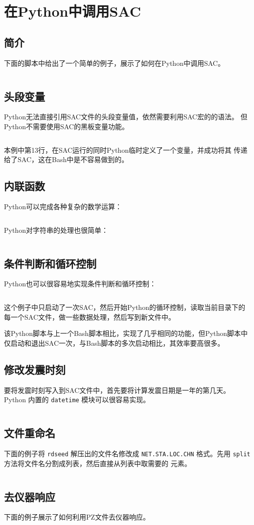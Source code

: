\section{在Python中调用SAC}
\label{sec:sac-python}

\subsection{简介}
下面的脚本中给出了一个简单的例子，展示了如何在Python中调用SAC。
\inputminted{python}{./call-in-script/simple-script.py}

\subsection{头段变量}
Python无法直接引用SAC文件的头段变量值，依然需要利用SAC宏的的语法。
但Python不需要使用SAC的黑板变量功能。
\inputminted{python}{./call-in-script/variables.py}
本例中第13行，在SAC运行的同时Python临时定义了一个变量，并成功将其
传递给了SAC，这在Bash中是不容易做到的。

\subsection{内联函数}
Python可以完成各种复杂的数学运算：
\inputminted{python}{./call-in-script/arithmetic-functions.py}

Python对字符串的处理也很简单：
\inputminted{python}{./call-in-script/string-functions.py}

\subsection{条件判断和循环控制}
Python也可以很容易地实现条件判断和循环控制：
\inputminted{python}{./call-in-script/do-loops.py}
这个例子中只启动了一次SAC，然后开始Python的循环控制，读取当前目录下的
每一个SAC文件，做一些数据处理，然后写到新文件中。

该Python脚本与上一个Bash脚本相比，实现了几乎相同的功能，但Python脚本中
仅启动和退出SAC一次，与Bash脚本的多次启动相比，其效率要高很多。

\subsection{修改发震时刻}
\label{subsec:ch-origin-python}
要将发震时刻写入到SAC文件中，首先要将计算发震日期是一年的第几天。Python
内置的 \texttt{datetime} 模块可以很容易实现。
\inputminted{python}{./call-in-script/ch-origin.py}

\subsection{文件重命名}
\label{subsec:rename-in-python}
下面的例子将 \texttt{rdseed} 解压出的文件名修改成 \texttt{NET.STA.LOC.CHN}
格式。先用 \texttt{split} 方法将文件名分割成列表，然后直接从列表中取需要的
元素。
\inputminted{python}{./call-in-script/rename.py}

\subsection{去仪器响应}
下面的例子展示了如何利用PZ文件去仪器响应。
\inputminted{python}{./call-in-script/transfer.py}
